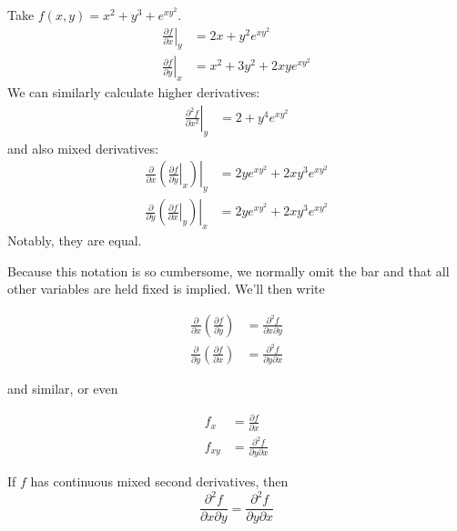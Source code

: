 \documentclass{../template/note}
\begin{document}
    \begin{example}
        Take \(f(x, y) = x^2+y^3+e^{xy^2}\).
        \begin{align*}
            \left.\frac{\partial f}{\partial x}\right|_y &= 2x + y^2e^{xy^2} \\
            \left.\frac{\partial f}{\partial y}\right|_x &= x^2 + 3y^2 + 2xye^{xy^2}
        \end{align*}
        We can similarly calculate higher derivatives:
        \begin{align*}
            \left.\frac{\partial^2 f}{\partial x^2}\right|_y &= 2 + y^4e^{xy^2}
        \end{align*}
        and also mixed derivatives:
        \begin{align*}
            \frac{\partial}{\partial x}\left.\left(\left.\frac{\partial f}{\partial y}\right|_x\right)\right|_y &= 2ye^{xy^2}+2xy^3e^{xy^2} \\
            \frac{\partial}{\partial y}\left.\left(\left.\frac{\partial f}{\partial x}\right|_y\right)\right|_x &= 2ye^{xy^2}+2xy^3e^{xy^2}
        \end{align*}
        Notably, they are equal.
    \end{example}
    Because this notation is so cumbersome, we normally omit the bar and that all other variables are held fixed is implied. We'll then write

    \begin{align*}
        \frac{\partial}{\partial x} \left(\frac{\partial f}{\partial y}\right) &= \frac{\partial^2 f}{\partial x \partial y} \\
        \frac{\partial}{\partial y} \left(\frac{\partial f}{\partial x}\right) &= \frac{\partial^2 f}{\partial y \partial x}
    \end{align*}

    and similar, or even

    \begin{align*}
        f_x &= \frac{\partial f}{\partial x} \\
        f_{xy} &= \frac{\partial^2 f}{\partial y \partial x}
    \end{align*}
    
    \begin{proposition}
        If \(f\) has continuous mixed second derivatives, then
        \[
            \frac{\partial^2 f}{\partial x \partial y} = \frac{\partial^2 f}{\partial y \partial x}
        \]
    \end{proposition}
\end{document}
